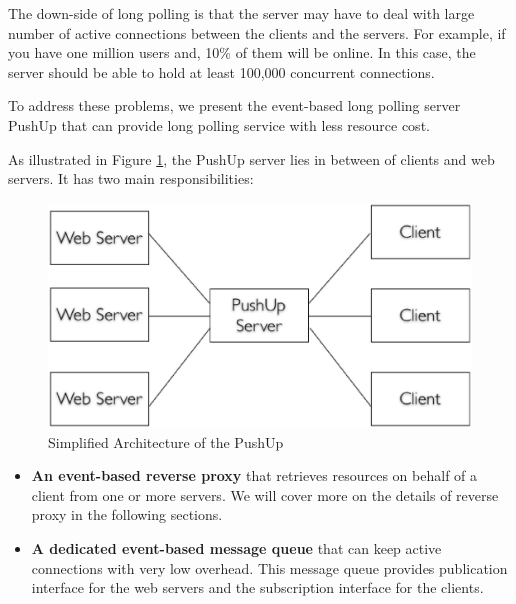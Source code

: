 The down-side of long polling is that the server may have to deal with large
number of active connections between the clients and the servers. For example,
if you have one million users and, 10\% of them will be online. In this case,
the server should be able to hold at least 100,000 concurrent connections.

To address these problems, we present the event-based\cite{UnixBook}  long polling 
server PushUp that can provide long polling service with less resource cost.

As illustrated in Figure \ref{fig:sim_pushup}, the PushUp server lies in 
between of clients and web servers. It has two main responsibilities:
\begin{figure}[htb!]
\centering
    \includegraphics[scale=0.40]{figures/sim_pushup.eps}
    \caption{Simplified Architecture of the PushUp}
    \label{fig:sim_pushup}
\end{figure}

\begin {itemize}
\item {\bf An event-based reverse proxy}\cite{ReverseProxy} that retrieves 
resources on behalf of a client from one or more servers. We will cover
more on the details of reverse proxy in the following sections.
\item {\bf A dedicated event-based message queue}\cite{PubSub} that can keep active 
connections with very low overhead. This message queue provides publication
interface for the web servers and the subscription interface for the clients.
\end {itemize}

